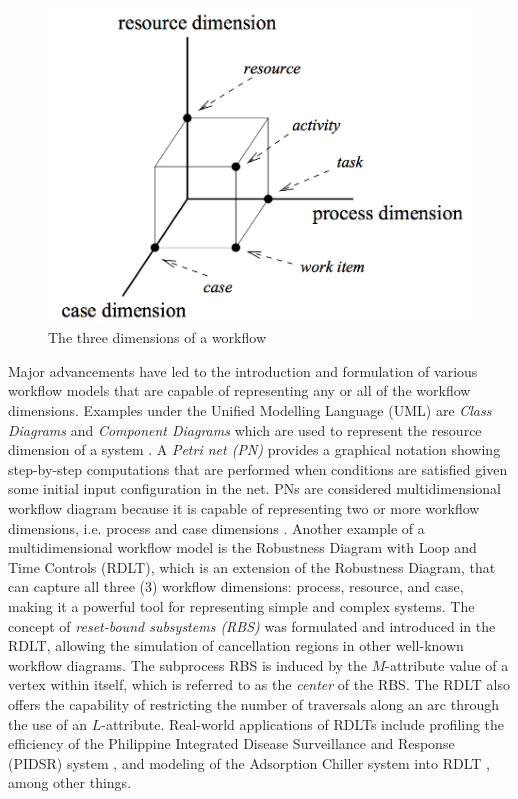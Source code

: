 \documentclass[12pt]{article}
\begin{document}
\begin{figure}[h]
    \centering
    \includegraphics{figures/workflow-dimensions.png}
    \caption{The three dimensions of a workflow \cite{vanderaalst}}
    \label{workflow_dimensions}
\end{figure} \par

Major advancements have led to the introduction and formulation of various workflow models that are capable of representing any or all of the workflow dimensions. Examples under the Unified Modelling Language (UML) are \textit{Class Diagrams} and \textit{Component Diagrams} which are used to represent the resource dimension of a system \cite{uml}. A \textit{Petri net (PN)} provides a graphical notation showing step-by-step computations that are performed when conditions are satisfied given some initial input configuration in the net. PNs are considered multidimensional workflow diagram because it is capable of representing two or more workflow dimensions, i.e. process and case dimensions \cite{yiu}. Another example of a multidimensional workflow model is the Robustness Diagram with Loop and Time Controls (RDLT), which is an extension of the Robustness Diagram, that can capture all three (3) workflow dimensions: process, resource, and case, making it a powerful tool for representing simple and complex systems. The concept of \textit{reset-bound subsystems (RBS)} was formulated and introduced in the RDLT, allowing the simulation of cancellation regions in other well-known workflow diagrams. The subprocess RBS is induced by the $M$-attribute value of a vertex within itself, which is referred to as the \textit{center} of the RBS. The RDLT also offers the capability of restricting the number of traversals along an arc through the use of an $L$-attribute. Real-world applications of RDLTs include profiling the efficiency of the Philippine Integrated Disease Surveillance and Response (PIDSR) system \cite{lopez-etal}, and modeling of the Adsorption Chiller system into RDLT \cite{malinao-rdlt}, among other things. \par
\end{document}

